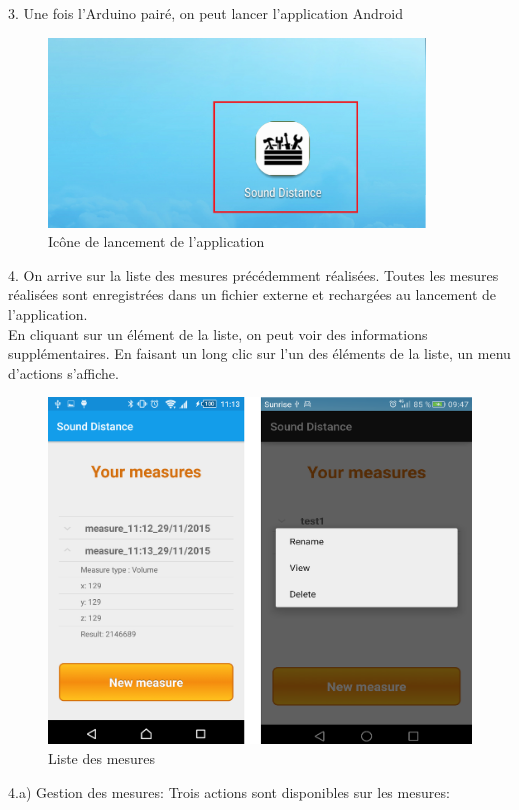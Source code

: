3. Une fois l'Arduino pairé, on peut lancer l'application Android
\begin{figure}[H]
	\begin{center}
		\includegraphics[width=10cm]{img/logo.png}
		\caption{Icône de lancement de l'application}
		\label{launch}
	\end{center}
\end{figure}
4. On arrive sur la liste des mesures précédemment réalisées. Toutes les mesures réalisées sont enregistrées dans un fichier externe et rechargées au lancement de l'application.\\ En cliquant sur un élément de la liste, on peut voir des informations supplémentaires. En faisant un long clic sur l'un des éléments de la liste, un menu d'actions s'affiche.
\begin{figure}[H]
	\begin{center}
		\includegraphics[width=12cm]{img/mesureList.png}
		\caption{Liste des mesures}
		\label{mesureList}
	\end{center}
\end{figure}
4.a) Gestion des mesures: Trois actions sont disponibles sur les mesures:
